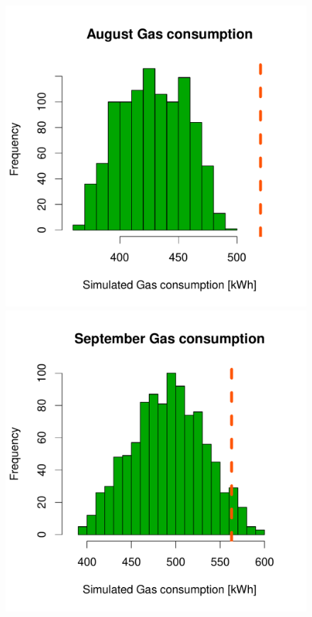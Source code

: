 \documentclass[a4paper, 12pt]{article}
\begin{document}
\begin{figure}
 \includegraphics[width=\scale]{Simulation_histograms/Batch_2_Only/August_Gas}
 \includegraphics[width=\scale]{Simulation_histograms/Batch_2_Only/September_Gas}\\

\end{figure}
\end{document}

